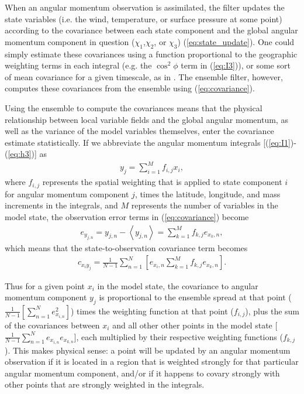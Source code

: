 When an angular momentum observation is assimilated, the filter updates the state variables (i.e. the wind, temperature, or surface pressure at some point) according to the covariance between each state component and the global angular momentum component in question ($\chi_1$,$\chi_2$, or $\chi_3$) (\ref{eq:state_update}). 
One could simply estimate these covariances using a function proportional to the geographic weighting terms in each integral (e.g. the $\cos^2 \phi$ term in (\ref{eq:I3})), or some sort of mean covariance for a given timescale, as in \citet{Nastula2009}.
The ensemble filter, however, computes these covariances from the ensemble using (\ref{eq:covariance}).

Using the ensemble to compute the covariances means that the physical relationship between local variable fields and the global angular momentum, as well as the variance of the model variables themselves, enter the covariance estimate statistically. 
If we abbreviate the angular momentum integrals [(\ref{eq:I1})-(\ref{eq:h3})] as
%
\begin{eqnarray}
y_j = \sum_{i=1}^M f_{i,j} x_i,
\end{eqnarray}
%
where $f_{i,j}$ represents the spatial weighting that is applied to state component $i$ for angular momentum component $j$, times the latitude, longitude, and mass increments in the integrals, and $M$ represents the number of variables in the model state,
the observation error terms in (\ref{eq:covariance}) become
\begin{eqnarray}
	e_{y_{j,n}} = y_{j,n} - \left< y_{j,n} \right>
		= \sum_{k=1}^{M}f_{k,j}e_{x_k,n},
\end{eqnarray}
which means that the state-to-observation covariance term becomes
\begin{eqnarray}
	c_{x_i y_j} = \frac{1}{N-1}
	\sum_{n=1}^{N}
	\left[
	e_{x_i,n}
	\sum_{k=1}^{M} f_{k,j}e_{x_k,n}
	\right].
	\label{eq:state_to_obs_covariance}
\end{eqnarray}

Thus for a given point $x_i$ in the model state, the covariance to angular momentum component $y_j$ is proportional to the ensemble spread at that point ($\frac{1}{N-1}\left[\sum_{n=1}^N  e_{x_{i,n}} ^2 \right]$) times the weighting function at that point ($f_{i,j}$), plus the sum of the covariances between $x_i$ and all other other points in the model state [$\frac{1}{N-1}\sum_{n=1}^N e_{x_{i,n}} e_{x_{k,n}}$], each multiplied by their respective weighting functions ($f_{k,j}$). 
This makes physical sense: a point will be updated by an angular momentum observation if it is located in a region that is weighted strongly for that particular angular momentum component, and/or if it happens to covary strongly with other points that are strongly weighted in the integrals.  

